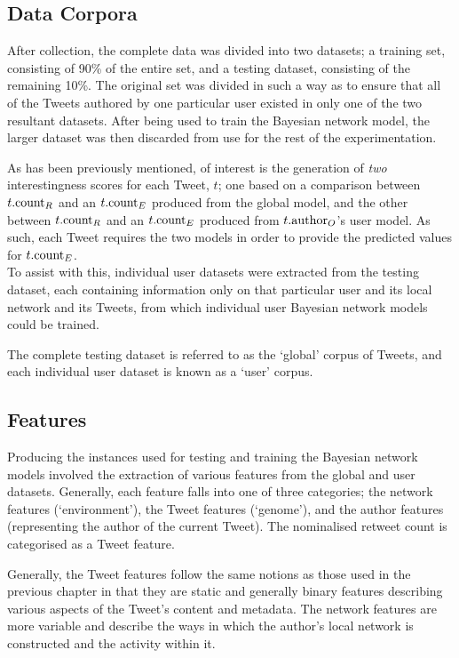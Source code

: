 \subsection{Data Corpora}
After collection, the complete data was divided into two datasets; a training set, consisting of 90\% of the entire set, and a testing dataset, consisting of the remaining 10\%. The original set was divided in such a way as to ensure that all of the Tweets authored by one particular user existed in only one of the two resultant datasets. After being used to train the Bayesian network model, the larger dataset was then discarded from use for the rest of the experimentation.

As has been previously mentioned, of interest is the generation of \textit{two} interestingness scores for each Tweet, $t$; one based on a comparison between $t.\textrm{count}_R$ and an $t.\textrm{count}_E$ produced from the global model, and the other between $t.\textrm{count}_R$ and an $t.\textrm{count}_E$ produced from $t.\textrm{author}_O$'s user model. As such, each Tweet requires the two models in order to provide the predicted values for $t.\textrm{count}_E$.\\
To assist with this, individual user datasets were extracted from the testing dataset, each containing information only on that particular user and its local network and its Tweets, from which individual user Bayesian network models could be trained.

The complete testing dataset is referred to as the `global' corpus of Tweets, and each individual user dataset is known as a `user' corpus.



\subsection{Features}
Producing the instances used for testing and training the Bayesian network models involved the extraction of various features from the global and user datasets. Generally, each feature falls into one of three categories; the network features (`environment'), the Tweet features (`genome'), and the author features (representing the author of the current Tweet). The nominalised retweet count is categorised as a Tweet feature.

Generally, the Tweet features follow the same notions as those used in the previous chapter in that they are static and generally binary features describing various aspects of the Tweet's content and metadata. The network features are more variable and describe the ways in which the author's local network is constructed and the activity within it.

